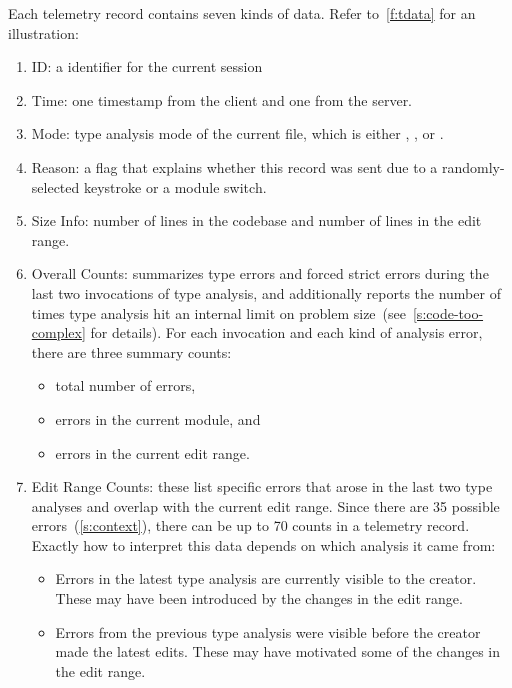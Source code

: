\documentclass[english,submission,cleveref]{programming}
\begin{document}
Each telemetry record contains seven kinds of data.
Refer to~\cref{f:tdata} for an illustration:
\begin{enumerate}
  \item
    ID: a \panon{} identifier for the current session
  \item
    Time: one timestamp from the client and one from the server.
  \item
    Mode: type analysis mode of the current file, which is either \mnocheck{},
    \mnonstrict{}, or \mstrict{}.
  \item
    Reason: a flag that explains whether this record was sent due to a
    randomly-selected keystroke or a module switch.
  \item
    Size Info: number of lines in the codebase and number of lines in the edit range.
  \item
    Overall Counts: summarizes type errors and forced strict errors during the
    last two invocations of type analysis, and additionally reports the number
    of times type analysis hit an internal limit on problem
    size~(see~\cref{s:code-too-complex} for details).
    For each invocation and each kind of
    analysis error, there are three summary counts:
    \begin{itemize}
      \item total number of errors,
      \item errors in the current module, and
      \item errors in the current edit range.
    \end{itemize}
  \item
    Edit Range Counts: these list specific errors that arose in the last two
    type analyses and overlap with the current edit range.
    Since there are 35 possible errors~(\cref{s:context}), there can be up to 70 counts
    in a telemetry record.
    Exactly how to interpret this data depends on which analysis it came from:
    \begin{itemize}
      \item
        Errors in the latest type analysis are currently visible to the
        creator.
        These may have been introduced by the changes in the edit range.
      \item
        Errors from the previous type analysis were visible before the creator
        made the latest edits.
        These may have motivated some of the changes in the edit range.
    \end{itemize}
\end{enumerate}
\end{document}
